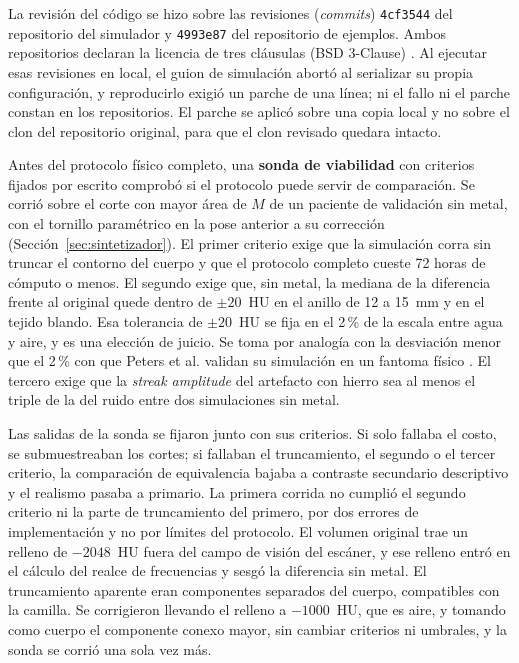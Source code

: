 La revisión del código se hizo sobre las revisiones (\emph{commits}) \texttt{4cf3544} del repositorio del simulador y \texttt{4993e87} del repositorio de ejemplos. Ambos repositorios declaran la licencia de tres cláusulas (BSD 3-Clause) \cite{xcist2026main,xcist2025example}. Al ejecutar esas revisiones en local, el guion de simulación abortó al serializar su propia configuración, y reproducirlo exigió un parche de una línea; ni el fallo ni el parche constan en los repositorios. El parche se aplicó sobre una copia local y no sobre el clon del repositorio original, para que el clon revisado quedara intacto.

Antes del protocolo físico completo, una \textbf{sonda de viabilidad} con criterios fijados por escrito comprobó si el protocolo puede servir de comparación. Se corrió sobre el corte con mayor área de $M$ de un paciente de validación sin metal, con el tornillo paramétrico en la pose anterior a su corrección (Sección~\ref{sec:sintetizador}). El primer criterio exige que la simulación corra sin truncar el contorno del cuerpo y que el protocolo completo cueste 72 horas de cómputo o menos. El segundo exige que, sin metal, la mediana de la diferencia frente al original quede dentro de $\pm 20$~HU en el anillo de 12 a 15~mm y en el tejido blando. Esa tolerancia de $\pm 20$~HU se fija en el 2\,\% de la escala entre agua y aire, y es una elección de juicio. Se toma por analogía con la desviación menor que el 2\,\% con que Peters et al. validan su simulación en un fantoma físico \cite{peters2025hybrid}. El tercero exige que la \emph{streak amplitude} del artefacto con hierro sea al menos el triple de la del ruido entre dos simulaciones sin metal.

Las salidas de la sonda se fijaron junto con sus criterios. Si solo fallaba el costo, se submuestreaban los cortes; si fallaban el truncamiento, el segundo o el tercer criterio, la comparación de equivalencia bajaba a contraste secundario descriptivo y el realismo pasaba a primario. La primera corrida no cumplió el segundo criterio ni la parte de truncamiento del primero, por dos errores de implementación y no por límites del protocolo. El volumen original trae un relleno de $-2048$~HU fuera del campo de visión del escáner, y ese relleno entró en el cálculo del realce de frecuencias y sesgó la diferencia sin metal. El truncamiento aparente eran componentes separados del cuerpo, compatibles con la camilla. Se corrigieron llevando el relleno a $-1000$~HU, que es aire, y tomando como cuerpo el componente conexo mayor, sin cambiar criterios ni umbrales, y la sonda se corrió una sola vez más.

